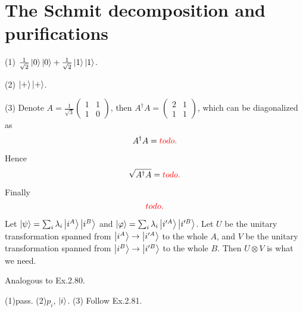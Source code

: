 \section{The Schmit decomposition and purifications}

\ex (1) $\frac{1}{\sqrt{2}}\left|0\right\rangle\left|0\right\rangle+\frac{1}{\sqrt{2}}\left|1\right\rangle\left|1\right\rangle$.

(2) $\left|+\right\rangle\left|+\right\rangle$.

(3) Denote $A=\frac{1}{\sqrt{3}}\begin{pmatrix}
    1 & 1 \\ 1 & 0
\end{pmatrix}$, then $A^\dagger A=\begin{pmatrix}
    2 & 1 \\ 1 & 1
\end{pmatrix}$, which can be diagonalized as
$$A^\dagger A={\color{red}{todo.}}$$

Hence
$$\sqrt{A^\dagger A}={\color{red}{todo.}}$$

Finally
$${\color{red}{todo.}}$$

\ex Let $\left|\psi\right\rangle=\sum_i\lambda_i\left|i^A\right\rangle\left|i^B\right\rangle$ and $\left|\varphi\right\rangle=\sum_i\lambda_i\left|i'^A\right\rangle\left|i'^B\right\rangle$.
Let $U$ be the unitary transformation spanned from $\left|i^A\right\rangle\rightarrow\left|i'^A\right\rangle$ to the whole $A$, and $V$ be the unitary transformation spanned from $\left|i^B\right\rangle\rightarrow\left|i'^B\right\rangle$ to the whole $B$.
Then $U\otimes V$ is what we need.

\ex Analogous to Ex.2.80.

\ex (1)pass. (2)$p_i$, $\left|i\right\rangle$. (3) Follow Ex.2.81.